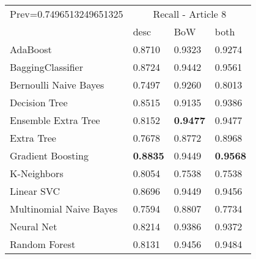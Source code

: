\begin{tabular}{|l|l|l|l| }
\hline
Prev=0.7496513249651325 &  \multicolumn{3}{c|}{Recall - Article 8} \\
\cline{2-4} & desc & BoW & both \\ \hline
AdaBoost                & 0.8710 & 0.9323 & 0.9274\\
BaggingClassifier       & 0.8724 & 0.9442 & 0.9561\\
Bernoulli Naive Bayes   & 0.7497 & 0.9260 & 0.8013\\
Decision Tree           & 0.8515 & 0.9135 & 0.9386\\
Ensemble Extra Tree     & 0.8152 & {\bf 0.9477} & 0.9477\\
Extra Tree              & 0.7678 & 0.8772 & 0.8968\\
Gradient Boosting       & {\bf 0.8835} & 0.9449 & {\bf 0.9568}\\
K-Neighbors             & 0.8054 & 0.7538 & 0.7538\\
Linear SVC              & 0.8696 & 0.9449 & 0.9456\\
Multinomial Naive Bayes & 0.7594 & 0.8807 & 0.7734\\
Neural Net              & 0.8214 & 0.9386 & 0.9372\\
Random Forest           & 0.8131 & 0.9456 & 0.9484\\
\hline
\end{tabular}
